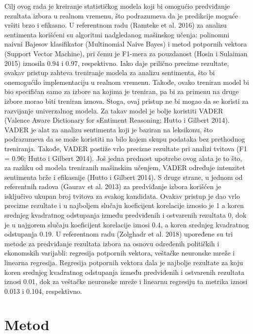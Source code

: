 \AuthorExHere

Cilj ovog rada je kreiranje statističkog modela koji bi omogućio predviđanje rezultata izbora u realnom vremenu, što podrazumeva da je predikcije moguće vršiti brzo i efikasno. U referentnom radu (Ramteke et al. 2016) za analizu sentimenta korišćeni su algoritmi nadgledanog mašinskog učenja: polinomni naivni Bajesov klasifikator (Multinomial Naive Bayes) i metod potpornih vektora (Support Vector Machine), pri čemu je F1-mera za pouzdanost (Hosin i Sulaiman 2015) iznosila 0.94 i 0.97, respektivno. Iako daje prilično precizne rezultate, ovakav pristup zahteva treniranje modela za analizu sentimenta, što bi onemogućilo implementaciju u realnom vremenu. Takođe, ovako treniran model bi bio specifičan samo za izbore na kojima je treniran, pa bi za primenu na druge izbore morao biti treniran iznova. Stoga, ovaj pristup ne bi mogao da se koristi za razvijanje univerzalnog modela. Za takav model je bolje koristiti VADER (Valence Aware Dictionary for sEntiment Reasoning; Hutto i Gilbert 2014). VADER je alat za analizu sentimenta koji je baziran na leksikonu, što podrazumeva da se može koristiti na bilo kojem skupu podataka bez prethodnog treniranja. Takođe, VADER postiže vrlo precizne rezultate pri analizi tvitova (F1 = 0.96; Hutto i Gilbert 2014). Još jedna prednost upotrebe ovog alata je to što, za razliku od modela treniranih mašinskim učenjem, VADER određuje intenzitet sentimenta brže i efikasnije (Hutto i Gilbert 2014). S druge strane, u jednom od referentnih radova (Gaurav et al. 2013) za predviđanje izbora korišćen je isključivo ukupan broj tvitova za svakog kandidata. Ovakav pristup je dao vrlo precizne rezultate i u najboljem slučaju koeficijent korelacije iznosio je 1 a koren srednjeg kvadratnog odstupanja između predviđenih i ostvarenih rezultata 0, dok je u najgorem slučaju koeficijent korelacije iznosi 0.4, a koren srednjeg kvadratnog odstupanja 0.19. U referentnom radu (Zolghadr et al. 2018) upoređene su tri metode za predviđanje rezultata izbora na osnovu određenih političkih i ekonomskih varijabli: regresija potpornih vektora, veštačke neuronske mreže i linearna regresija. Regresija potpornih vektora dala je najbolje rezultate za koju koren srednjeg kvadratnog odstupanja između predviđenih i ostvarenih rezultata iznosi 0.01, dok za veštačke neuronske mreže i linearnu regresiju ta metrika iznosi 0.013 i 0.104, respektivno. 

\section{Metod}

